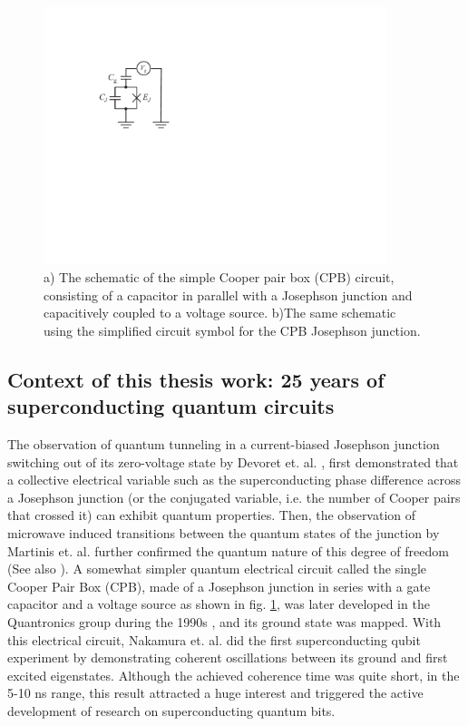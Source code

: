 %
\begin{figure}[ht!]
 \centering \includegraphics[width=10cm]{./material/figures/introduction/cooper_pair_box_simple}
\caption[]{a) The schematic of the simple Cooper pair box (CPB) circuit, consisting
of a capacitor in parallel with a Josephson junction and capacitively
coupled to a voltage source. b)The same schematic using the simplified
circuit symbol for the CPB Josephson junction.}


\label{fig:cooper_pair_box_simple} %
\end{figure}



\subsection{Context of this thesis work: 25 years of superconducting
quantum circuits}

The observation of quantum tunneling in a current-biased
Josephson junction switching out of its zero-voltage
state by Devoret et. al. \citep{devoret_measurements_1985,martinis_energy-level_1985},
first demonstrated that a collective electrical variable
such as the superconducting phase difference across a Josephson junction (or the conjugated variable, i.e. the number of Cooper
pairs that crossed it) can exhibit quantum properties. Then,
the observation of microwave induced transitions between the quantum
states of the junction by Martinis et. al. \citep{martinis_energy-level_1985} further
confirmed the quantum nature of this degree of freedom (See also \cite{martinis_energy-level_1985,martinis_experimental_1987,clarke_quantum_1988}).
A somewhat simpler quantum electrical circuit called the single Cooper
Pair Box (CPB), made of a Josephson junction in series
with a gate capacitor and a voltage source as shown in fig.
\ref{fig:cooper_pair_box_simple}, was later developed in the Quantronics
group during the 1990s \citep{bouchiat_quantum_1998},
and its ground state was mapped. With this electrical
circuit, Nakamura et. al. \citep{nakamura_coherent_1999} did the first superconducting
qubit experiment by demonstrating coherent oscillations between its
ground and first excited eigenstates. Although the achieved coherence
time was quite short, in the 5-10 ns range, this result attracted
a huge interest and triggered the active development of research on
superconducting quantum bits.


